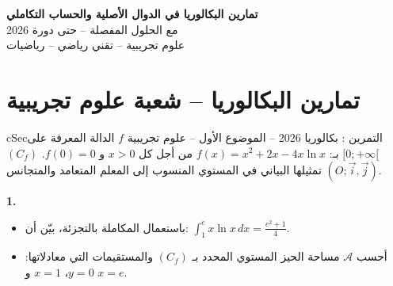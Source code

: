 \documentclass[12pt,a4paper]{article}
\newenvironment{BOX}[2]{\begin{otherlanguage}{english}\begin{arbox}{#1}{#2}}{\end{arbox}\end{otherlanguage}}
\newcounter{exo}
\newenvironment{tamrin}[1]{\stepcounter{exo}\begin{BOX}{cSec}{التمرين \theexo: #1}}{\end{BOX}}
\newenvironment{LTR}{\begin{otherlanguage}{english}}{\end{otherlanguage}}
\newenvironment{sq}{\begin{itemize}[leftmargin=2.4em,itemsep=3pt]}{\end{itemize}}
\newcommand{\qa}{\item[(أ)]}\newcommand{\qb}{\item[(ب)]}\newcommand{\qc}{\item[(جـ)]}\newcommand{\qd}{\item[(د)]}\newcommand{\qe}{\item[(هـ)]}
\newcommand{\QQ}[1]{\par\smallskip\textbf{#1.} }
\begin{document}
\begin{LTR}
\begin{tcolorbox}[enhanced,colback=cSec,colframe=cSec,arc=3mm,halign=center,boxrule=0pt,top=12pt,bottom=12pt,before upper={\selectlanguage{arabic}}]
{\color{white}\fontsize{22}{28}\selectfont\bfseries تمارين البكالوريا في الدوال الأصلية والحساب التكاملي}\\[8pt]
{\color{white}\large مع الحلول المفصلة -- حتى دورة 2026}\\[5pt]
{\color{white}\large علوم تجريبية -- تقني رياضي -- رياضيات}
\end{tcolorbox}
\end{LTR}
\section{تمارين البكالوريا -- شعبة علوم تجريبية}
\begin{tamrin}{بكالوريا 2026 -- الموضوع الأول -- علوم تجريبية}
$f$ الدالة المعرفة على $[0;+\infty[$ بـ: $f(x)=x^2+2x-4x\ln x$ من أجل كل $x>0$ و $f(0)=0$.
$(C_f)$ تمثيلها البياني في المستوي المنسوب إلى المعلم المتعامد والمتجانس $(O;\vec i,\vec j)$.
\QQ{1}
\begin{sq}
\qa باستعمال المكاملة بالتجزئة، بيّن أن: $\displaystyle\int_1^e x\ln x\,dx=\frac{e^2+1}{4}$.
\qb أحسب $\mathcal{A}$ مساحة الحيز المستوي المحدد بـ $(C_f)$ والمستقيمات التي معادلاتها: $y=0$، $x=1$ و $x=e$.
\end{sq}
\end{tamrin}
\end{document}
